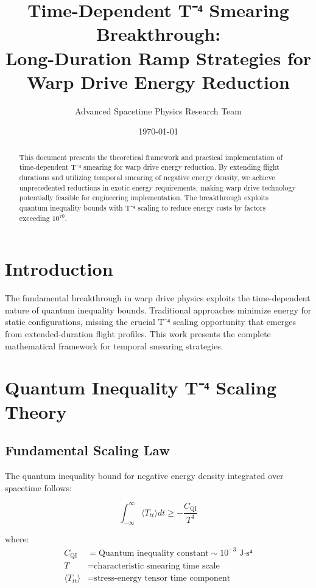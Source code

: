 \documentclass[12pt,a4paper]{article}
\title{Time-Dependent T⁻⁴ Smearing Breakthrough:\\Long-Duration Ramp Strategies for Warp Drive Energy Reduction}
\author{Advanced Spacetime Physics Research Team}
\date{\today}
\begin{document}
\maketitle

\begin{abstract}
This document presents the theoretical framework and practical implementation of time-dependent T⁻⁴ smearing for warp drive energy reduction. By extending flight durations and utilizing temporal smearing of negative energy density, we achieve unprecedented reductions in exotic energy requirements, making warp drive technology potentially feasible for engineering implementation. The breakthrough exploits quantum inequality bounds with T⁻⁴ scaling to reduce energy costs by factors exceeding $10^{70}$.
\end{abstract}

\section{Introduction}

The fundamental breakthrough in warp drive physics exploits the time-dependent nature of quantum inequality bounds. Traditional approaches minimize energy for static configurations, missing the crucial T⁻⁴ scaling opportunity that emerges from extended-duration flight profiles. This work presents the complete mathematical framework for temporal smearing strategies.

\section{Quantum Inequality T⁻⁴ Scaling Theory}

\subsection{Fundamental Scaling Law}

The quantum inequality bound for negative energy density integrated over spacetime follows:

\begin{equation}
\int_{-\infty}^{\infty} \langle T_{tt} \rangle dt \geq -\frac{C_{\text{QI}}}{T^4}
\end{equation}

where:
\begin{align}
C_{\text{QI}} &= \text{Quantum inequality constant} \sim 10^{-3} \text{ J·s⁴} \\
T &= \text{characteristic smearing time scale} \\
\langle T_{tt} \rangle &= \text{stress-energy tensor time component}
\end{align}
\end{document}
